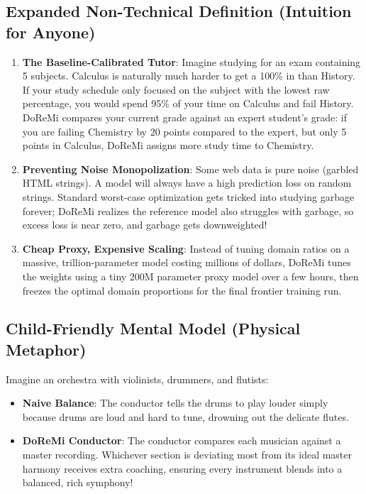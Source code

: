 \documentclass[11pt,a4paper]{article}
\theoremstyle{definition}
\begin{document}
\subsection{Expanded Non-Technical Definition (Intuition for Anyone)}
\begin{enumerate}
    \item \textbf{The Baseline-Calibrated Tutor}: Imagine studying for an exam containing 5 subjects. Calculus is naturally much harder to get a 100\% in than History. If your study schedule only focused on the subject with the lowest raw percentage, you would spend 95\% of your time on Calculus and fail History. DoReMi compares your current grade against an expert student's grade: if you are failing Chemistry by 20 points compared to the expert, but only 5 points in Calculus, DoReMi assigns more study time to Chemistry.
    \item \textbf{Preventing Noise Monopolization}: Some web data is pure noise (garbled HTML strings). A model will always have a high prediction loss on random strings. Standard worst-case optimization gets tricked into studying garbage forever; DoReMi realizes the reference model also struggles with garbage, so excess loss is near zero, and garbage gets downweighted!
    \item \textbf{Cheap Proxy, Expensive Scaling}: Instead of tuning domain ratios on a massive, trillion-parameter model costing millions of dollars, DoReMi tunes the weights using a tiny 200M parameter proxy model over a few hours, then freezes the optimal domain proportions for the final frontier training run.
\end{enumerate}

\subsection{Child-Friendly Mental Model (Physical Metaphor)}
Imagine an orchestra with violinists, drummers, and flutists:
\begin{itemize}
    \item \textbf{Naive Balance}: The conductor tells the drums to play louder simply because drums are loud and hard to tune, drowning out the delicate flutes.
    \item \textbf{DoReMi Conductor}: The conductor compares each musician against a master recording. Whichever section is deviating most from its ideal master harmony receives extra coaching, ensuring every instrument blends into a balanced, rich symphony!
\end{itemize}
\end{document}
